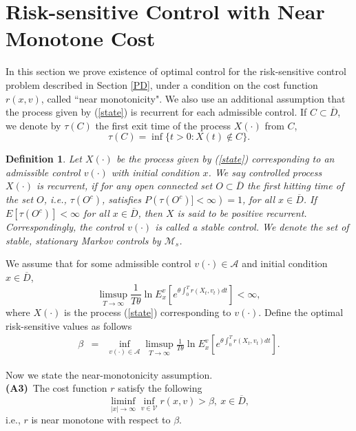 \documentclass[11pt]{amsart}
\newtheorem{definitions}{\bf Definition}[section]
\numberwithin{equation}{section}
\begin{document}
\section{Risk-sensitive Control with Near Monotone Cost}
\thispagestyle{empty}
In this section we prove existence of optimal control for the risk-sensitive control problem 
described in Section \ref{PD}, under a condition on the cost function $r(x,v)$, called
``near monotonicity". We also use an additional assumption that the process given by (\ref{state})
is recurrent for each admissible control.
If $C\subset \overline{D}$, we denote by $\tau(C)$ the first exit time of the 
process $X(\cdot)$ from $C$,
$$
\tau(C)=\inf \{ t>0: X(t) \notin C\}.
$$
\begin{definitions}
Let $X(\cdot)$ be the process given by (\ref{state}) corresponding to an admissible  control $v(\cdot)$ with initial condition $x$. We say controlled process $X(\cdot)$  is {\it  recurrent}, if for any open connected set $O\subset \overline{D}$ the first
hitting time of the set $O$, i.e., $\tau(O^c)$, satisfies
 $P ( \tau(O^c)]<\infty ) = 1$, for all $x\in\overline {D}$. If 
$E [\tau(O^c)] < \infty$ for all $x \in \overline{D}$, then $X$ is said to be positive recurrent. 
Correspondingly, the control $v(\cdot)$ is called a stable  control.  
We denote the set of stable, stationary Markov controls by $\mathcal M_{s}$.
\end{definitions}


We assume that for some admissible control $v(\cdot)\in \mathcal A$ and initial condition $x\in\overline{D} $,
$$
 \limsup_{T \longrightarrow \infty}
\frac{1}{T\theta}\ln E^v_x\left[ e^{\theta\int_{0}^T r(X_t,v_t) dt}\right]  < \infty,
 $$
 where $X(\cdot)$ is the process (\ref{state}) corresponding to $v(\cdot)$. Define the optimal  risk-sensitive values as follows
\begin{eqnarray*}
\beta & = & \inf_{v(\cdot)\in\mathcal A } \limsup_{T \longrightarrow \infty}
\frac{1}{T\theta}\ln E^v_x\left[ e^{\theta\int_{0}^T r(X_t,v_t) dt}\right] .
\end{eqnarray*}

Now we state the near-monotonicity assumption. \\
{\bf (A3)}\ The cost function $r$ satisfy the following
\begin{equation}\label{near-monotone}
\liminf_{|x|\longrightarrow \infty} \inf_{v\in\mathcal V} r(x,v) > \beta, \ x\in \overline {D}, %
\end{equation}
i.e., $r$ is near monotone with respect to $\beta$. 
\end{document}
